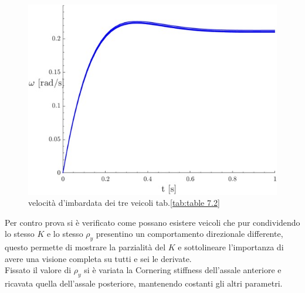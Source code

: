 \begin{figure}[!h]
    \centering
    \includegraphics[scale=0.6]{Immagini/Understeer Gradient/table7.2 r.jpg}
    \caption{velocità d'imbardata dei tre veicoli tab.\ref{tab:table 7.2}}
    \label{fig:table7.2 r}
\end{figure}
Per contro prova si è verificato come possano esistere veicoli che pur condividendo lo stesso $K$ e lo stesso $\rho_y$ 
presentino un comportamento direzionale differente, questo permette di mostrare la parzialità del $K$ e sottolineare
l'importanza di avere una visione completa su tutti e sei le derivate.\\
Fissato il valore di $\rho_y$ si è variata la Cornering stiffness dell'assale anteriore e ricavata quella dell'assale
posteriore, mantenendo costanti gli altri parametri.\\

